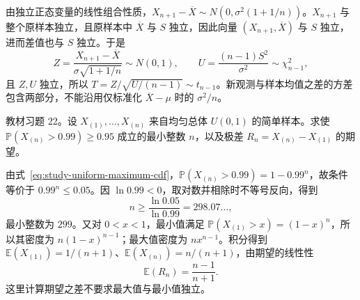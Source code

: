 \begin{solve}
由独立正态变量的线性组合性质，$X_{n+1}-\overline X\sim N(0,\sigma^2(1+1/n))$。$X_{n+1}$ 与整个原样本独立，且原样本中 $\overline X$ 与 $S$ 独立，因此向量 $(X_{n+1},\overline X)$ 与 $S$ 独立，进而差值也与 $S$ 独立。于是
\[
  Z=\frac{X_{n+1}-\overline X}{\sigma\sqrt{1+1/n}}\sim N(0,1),
  \qquad U=\frac{(n-1)S^2}{\sigma^2}\sim\chi^2_{n-1},
\]
且 $Z,U$ 独立，所以 $T=Z/\sqrt{U/(n-1)}\sim t_{n-1}$。新观测与样本均值之差的方差包含两部分，不能沿用仅标准化 $\overline X-\mu$ 时的 $\sigma^2/n$。
\end{solve}

\begin{example}
\label{ex:study-uniform-range-exercise}
教材习题 22。设 $X_{(1)},\ldots,X_{(n)}$ 来自均匀总体 $U(0,1)$ 的简单样本。求使 $\mathbb P(X_{(n)}>0.99)\ge0.95$ 成立的最小整数 $n$，以及极差 $R_n=X_{(n)}-X_{(1)}$ 的期望。
\end{example}

\begin{solve}
由式~\eqref{eq:study-uniform-maximum-cdf}，$\mathbb P(X_{(n)}>0.99)=1-0.99^n$，故条件等价于 $0.99^n\le0.05$。因 $\ln0.99<0$，取对数并相除时不等号反向，得到
\[
  n\ge\frac{\ln0.05}{\ln0.99}=298.07\ldots,
\]
最小整数为 $299$。又对 $0<x<1$，最小值满足 $\mathbb P(X_{(1)}>x)=(1-x)^n$，所以其密度为 $n(1-x)^{n-1}$；最大值密度为 $nx^{n-1}$。积分得到 $\mathbb E(X_{(1)})=1/(n+1)$、$\mathbb E(X_{(n)})=n/(n+1)$，由期望的线性性
\[
  \mathbb E(R_n)=\frac{n-1}{n+1}.
\]
这里计算期望之差不要求最大值与最小值独立。
\end{solve}





